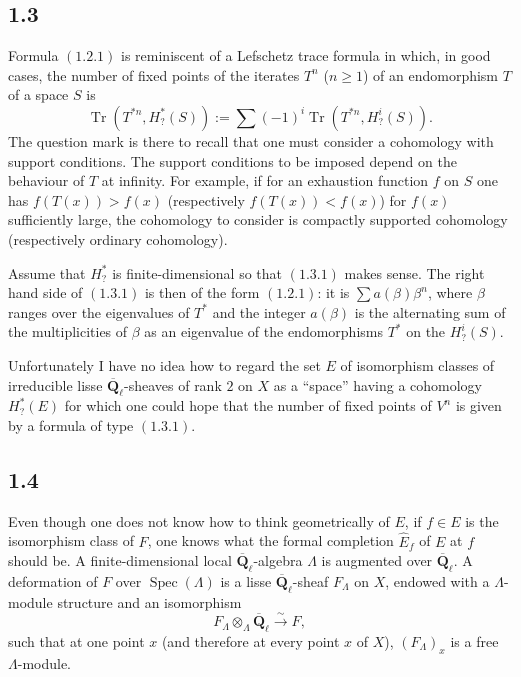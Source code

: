 \documentclass[11pt]{article}
\newcommand{\Qbar}{\overline{\mathbf Q}}
\newcommand{\Spec}{\operatorname{Spec}}
\newcommand{\Tr}{\operatorname{Tr}}
\begin{document}
\subsection{1.3}
Formula \((1.2.1)\) is reminiscent of a Lefschetz trace formula in which, in good cases, the number of fixed points of the iterates \(T^n\) (\(n\ge 1\)) of an endomorphism \(T\) of a space \(S\) is
\begin{equation}\tag{1.3.1}
\Tr(T^{*n},H^*_?(S)):=\sum (-1)^i\Tr(T^{*n},H^i_?(S)).
\end{equation}
The question mark is there to recall that one must consider a cohomology with support conditions. The support conditions to be imposed depend on the behaviour of \(T\) at infinity. For example, if for an exhaustion function \(f\) on \(S\) one has \(f(T(x))>f(x)\) (respectively \(f(T(x))<f(x)\)) for \(f(x)\) sufficiently large, the cohomology to consider is compactly supported cohomology (respectively ordinary cohomology).

Assume that \(H^*_?\) is finite-dimensional so that \((1.3.1)\) makes sense. The right hand side of \((1.3.1)\) is then of the form \((1.2.1)\): it is \(\sum a(\beta)\beta^n\), where \(\beta\) ranges over the eigenvalues of \(T^*\) and the integer \(a(\beta)\) is the alternating sum of the multiplicities of \(\beta\) as an eigenvalue of the endomorphisms \(T^*\) on the \(H^i_?(S)\).

Unfortunately I have no idea how to regard the set \(E\) of isomorphism classes of irreducible lisse \(\Qbar_\ell\)-sheaves of rank \(2\) on \(X\) as a ``space'' having a cohomology \(H^*_?(E)\) for which one could hope that the number of fixed points of \(V^n\) is given by a formula of type \((1.3.1)\).

\subsection{1.4}
Even though one does not know how to think geometrically of \(E\), if \(f\in E\) is the isomorphism class of \(F\), one knows what the formal completion \(\widehat E_f\) of \(E\) at \(f\) should be. A finite-dimensional local \(\Qbar_\ell\)-algebra \(\Lambda\) is augmented over \(\Qbar_\ell\). A deformation of \(F\) over \(\Spec(\Lambda)\) is a lisse \(\Qbar_\ell\)-sheaf \(F_\Lambda\) on \(X\), endowed with a \(\Lambda\)-module structure and an isomorphism
\[
F_\Lambda\otimes_\Lambda \Qbar_\ell \xrightarrow{\sim} F,
\]
such that at one point \(x\) (and therefore at every point \(x\) of \(X\)), \((F_\Lambda)_x\) is a free \(\Lambda\)-module.
\end{document}
